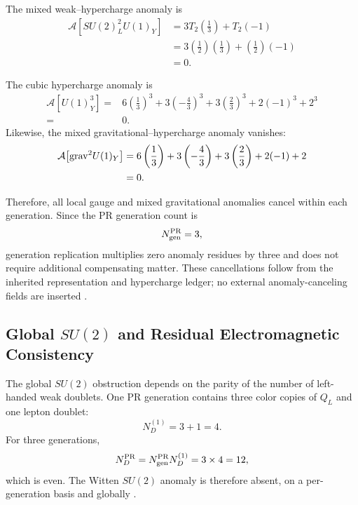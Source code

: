 \documentclass[11pt]{article}
\begin{document}
The mixed weak--hypercharge anomaly is
\begin{align}
\mathcal A\!\left[SU(2)_L^2U(1)_Y\right]
&=
3T_2\left(\frac13\right)
+
T_2(-1)
\nonumber\\
&=
3\left(\frac12\right)\left(\frac13\right)
+
\left(\frac12\right)(-1)
\nonumber\\
&=0.
\end{align}

The cubic hypercharge anomaly is
\begin{align}
\mathcal A\!\left[U(1)_Y^3\right]
={}&
6\left(\frac13\right)^3
+
3\left(-\frac43\right)^3
+
3\left(\frac23\right)^3
+
2(-1)^3
+
2^3
\nonumber\\
={}&0.
\end{align}
Likewise, the mixed gravitational--hypercharge anomaly vanishes:
\begin{align}
\mathcal A\!\left[{\rm grav}^2U(1)_Y\right]
={}&
6\left(\frac13\right)
+
3\left(-\frac43\right)
+
3\left(\frac23\right)
+
2(-1)
+
2
\nonumber\\
={}&0.
\end{align}

Therefore, all local gauge and mixed gravitational anomalies cancel within each generation.  Since the PR generation count is
\begin{equation}
N_{\rm gen}^{\rm PR}=3,
\end{equation}
generation replication multiplies zero anomaly residues by three and does not require additional compensating matter.  These cancellations follow from the inherited representation and hypercharge ledger; no external anomaly-canceling fields are inserted \cite{Adler1969, BellJackiw1969, Bardeen1969}.

\subsection{Global \texorpdfstring{$SU(2)$}{SU(2)} and Residual Electromagnetic Consistency}
\label{subsec:priii-witten-vectorlike-consistency}

The global \(SU(2)\) obstruction depends on the parity of the number of left-handed weak doublets.  One PR generation contains three color copies of \(Q_L\) and one lepton doublet:
\begin{equation}
N_D^{(1)}
=
3+1
=
4.
\end{equation}
For three generations,
\begin{equation}
N_D^{\rm PR}
=
N_{\rm gen}^{\rm PR}N_D^{(1)}
=
3\times4
=
12,
\end{equation}
which is even.  The Witten \(SU(2)\) anomaly is therefore absent, on a per-generation basis and globally \cite{Witten1982}.
\end{document}
